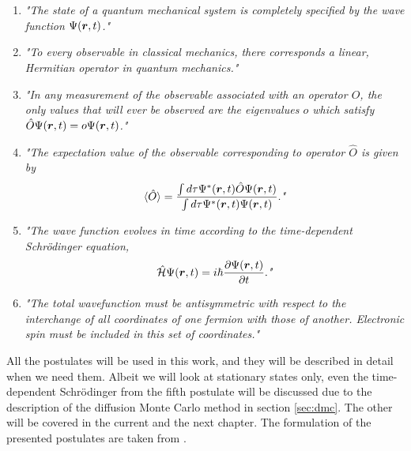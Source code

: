 \begin{enumerate}
	\item \textit{"The state of a quantum mechanical system is completely specified by the wave function $\Psi(\boldsymbol{{r}},t)$."}
	
	\item \textit{"To every observable in classical mechanics, there corresponds a linear, Hermitian operator in quantum mechanics."}
	
	\item \textit{"In any measurement of the observable associated with an operator $\hat{O}$, the only values that will ever be observed are the eigenvalues $o$ which satisfy $\hat{O}\Psi(\boldsymbol{{r}},t)=o\Psi(\boldsymbol{{r}},t)$."}
	
	\item \textit{"The expectation value of the observable corresponding to operator $\hat{O}$ is given by
		$$\langle\hat{O}\rangle=\frac{\int d\tau\Psi^*(\boldsymbol{{r}},t)\hat{O}\Psi(\boldsymbol{{r}},t)}{\int d\tau\Psi^*(\boldsymbol{{r}},t)\Psi(\boldsymbol{{r}},t)}.\textit{"}$$}
	
	\item \textit{"The wave function evolves in time according to the time-dependent Schrödinger equation,
		$$\hat{\mathcal{H}}\Psi(\boldsymbol{{r}},t)=i\hbar\frac{\partial\Psi(\boldsymbol{{r}},t)}{\partial t}.\textit{"}$$}
	
	\item \textit{"The total wavefunction must be antisymmetric with respect to the interchange of all coordinates of one fermion with those of another. Electronic spin must be included in this set of coordinates."} 
\end{enumerate}
All the postulates will be used in this work, and they will be described in detail when we need them. Albeit we will look at stationary states only, even the time-dependent Schrödinger from the fifth postulate will be discussed due to the description of the diffusion Monte Carlo method in section \ref{sec:dmc}. The other will be covered in the current and the next chapter. The formulation of the presented postulates are taken from \cite{sherrill_david_postulates_2003}.

